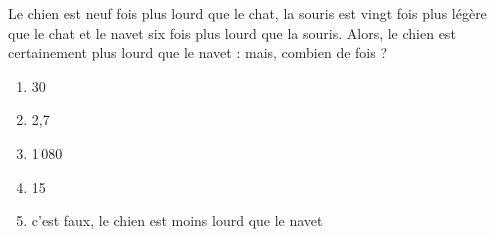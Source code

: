 Le chien est neuf fois plus lourd que le chat, la souris est vingt fois plus légère que le chat et le navet six fois plus lourd que la souris. Alors, le chien est certainement plus lourd que le navet : mais, combien de fois ?
\begin{multicols}{3}
  \begin{enumerate}[A/]
  \item 30
  \item 2,7
  \item 1\,080
  \item 15
  \item c'est faux, le chien est moins lourd que le navet
  \end{enumerate}
\end{multicols}